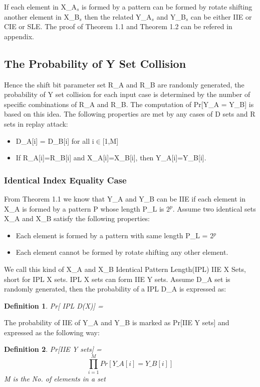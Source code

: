 \documentclass{article}
\newtheorem{defination}{Definition}[section]
\begin{document}
If each element in X\_A$_s$ is formed by a pattern can be formed by rotate shifting another element in X\_B$_s$ then the related Y\_A$_s$ and Y\_B$_s$ can be either IIE or CIE or SLE.
The proof of Theorem 1.1 and Theorem 1.2 can be refered in appendix.


\subsection{The Probability of Y Set Collision} 
Hence the shift bit parameter set R\_A and R\_B are randomly generated, the probability of Y set collision for each input case is determined by the number of specific combinations of R\_A and R\_B. The computation of Pr[Y\_A = Y\_B] is based on this idea.
The following properties are met by any cases of D sets and R sets in replay attack:
\begin{itemize}
	\item D\_A[i] = D\_B[i] for all i$\in$[1,M]
	\item If R\_A[i]=R\_B[i] and X\_A[i]=X\_B[i], then Y\_A[i]=Y\_B[i].
\end{itemize}

\subsubsection{Identical Index Equality Case}
From Theorem 1.1 we know that Y\_A and Y\_B can be IIE if each element in X\_A is formed by a pattern P whose length P\_L is 2$^p$. 
Assume two identical sets X\_A and X\_B satisfy the following properties:
\begin{itemize}
	\item Each element is formed by a pattern with same length P\_L = 2$^p$
	\item Each element cannot be formed by rotate shifting any other element.
\end{itemize}

We call this kind of X\_A and X\_B Identical Pattern Length(IPL) IIE X Sets, short for IPL X sets. 
IPL X sets can form IIE Y sets.
Assume D\_A set is randomly generated, then the probability of a IPL D\_A is expressed as:
\begin{defination}
Pr[ IPL D(X)] = 
\end{defination} 

The probability of IIE of Y\_A and Y\_B is marked as Pr[IIE Y sets] and expressed as the following way:
\begin{defination}
Pr[IIE Y sets] = $$\prod_{i=1}^M Pr[Y\_A[i] = Y\_B[i]]$$ M is the No. of elements in a set
\end{defination} 
\end{document}

